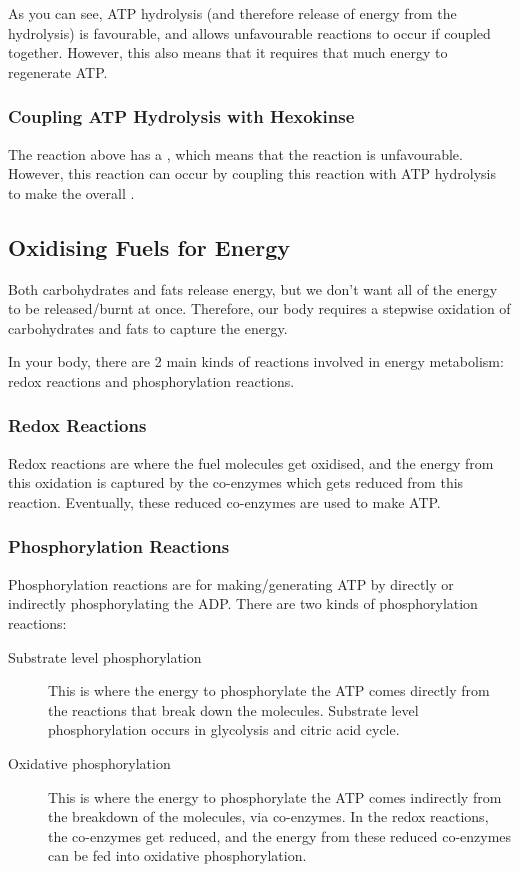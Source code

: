 As you can see, ATP hydrolysis (and therefore release of energy from the hydrolysis) is favourable, and allows unfavourable reactions to occur if coupled together.
However, this also means that it requires that much energy to regenerate ATP.

\subsubsection{Coupling ATP Hydrolysis with Hexokinse}

\begin{center}
\end{center}

The reaction above has a , which means that the reaction is unfavourable.
However, this reaction can occur by coupling this reaction with ATP hydrolysis to make the overall .

\subsection{Oxidising Fuels for Energy}

Both carbohydrates and fats release energy, but we don't want all of the energy to be released/burnt at once.
Therefore, our body requires a stepwise oxidation of carbohydrates and fats to capture the energy.

In your body, there are 2 main kinds of reactions involved in energy metabolism: redox reactions and phosphorylation reactions.

\subsubsection{Redox Reactions}

Redox reactions are where the fuel molecules get oxidised, and the energy from this oxidation is captured by the co-enzymes which gets reduced from this reaction.
Eventually, these reduced co-enzymes are used to make ATP.

\subsubsection{Phosphorylation Reactions}

Phosphorylation reactions are for making/generating ATP by directly or indirectly phosphorylating the ADP.
There are two kinds of phosphorylation reactions:
\begin{description}
    \item[Substrate level phosphorylation] This is where the energy to phosphorylate the ATP comes directly from the reactions that break down the molecules.
        Substrate level phosphorylation occurs in glycolysis and citric acid cycle.
    \item [Oxidative phosphorylation] This is where the energy to phosphorylate the ATP comes indirectly from the breakdown of the molecules, via co-enzymes.
        In the redox reactions, the co-enzymes get reduced, and the energy from these reduced co-enzymes can be fed into oxidative phosphorylation.
\end{description}

